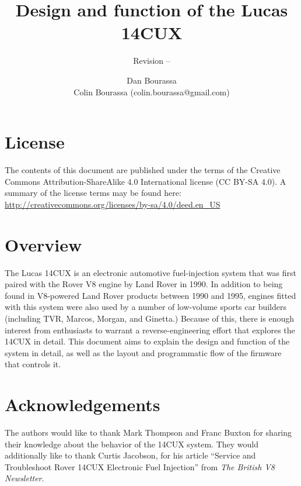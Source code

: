 \documentclass[11pt,twocolumn]{scrartcl}
\begin{document}
\setlength{\abovecaptionskip}{3pt}
\setlength{\belowcaptionskip}{10pt}


\begin{multicols}{2}
\title{Design and function of the Lucas 14CUX}
\subtitle{Revision --}
\author{
	Dan Bourassa \\
	Colin Bourassa (colin.bourassa@gmail.com)\\
    }
\date{}
\maketitle
\end{multicols}

\section {License}
The contents of this document are published under the terms of the Creative Commons Attribution-ShareAlike 4.0 International license (CC BY-SA 4.0). A summary of the license terms may be found here: \url{http://creativecommons.org/licenses/by-sa/4.0/deed.en_US}

\section {Overview}
The Lucas 14CUX is an electronic automotive fuel-injection system that was first paired with the Rover V8 engine by Land Rover in 1990. In addition to being found in V8-powered Land Rover products between 1990 and 1995, engines fitted with this system were also used by a number of low-volume sports car builders (including TVR, Marcos, Morgan, and Ginetta.) Because of this, there is enough interest from enthusiasts to warrant a reverse-engineering effort that explores the 14CUX in detail. This document aims to explain the design and function of the system in detail, as well as the layout and programmatic flow of the firmware that controls it.

\section {Acknowledgements}
The authors would like to thank Mark Thompson and Franc Buxton for sharing their knowledge about the behavior of the 14CUX system. They would additionally like to thank Curtis Jacobson, for his article ``Service and Troubleshoot Rover 14CUX Electronic Fuel Injection'' from {\em The British V8 Newsletter}.
\end{document}

